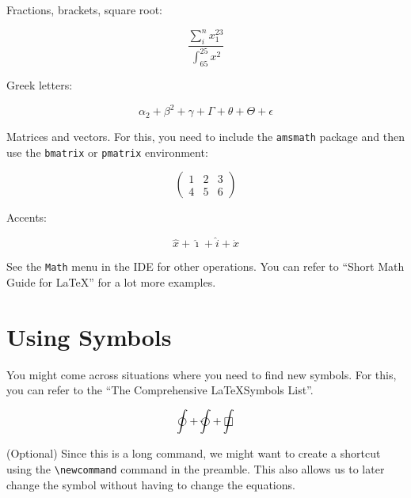 \documentclass{book}
\begin{document}
Fractions, brackets, square root: 

\begin{equation}\label{eq:nested_frac}
\frac{
	\sum_{i}^{n} x_1^{23}
}{
	\int_{65}^{25} x^{2}}
\end{equation}

Greek letters: 

\begin{equation}\label{eq:nested_frac}
\alpha_2 + \beta^2 + \gamma + \Gamma + \theta   + \Theta  + \epsilon
\end{equation}

Matrices and vectors. For this, you need to include the \texttt{amsmath} package and then use the \texttt{bmatrix} or \texttt{pmatrix} environment: 


\begin{equation}\label{eq:matrix}
	\begin{pmatrix}
    1    &    2   &   3   \\
    4   &    5   &   6
	\end{pmatrix}
\end{equation}



Accents: 

\begin{equation}\label{eq:hat1}
\hat{x} + \hat{\imath} + \hat{i}  + \dot{x}
\end{equation}




See the \texttt{Math} menu in the IDE for other operations. You can refer to ``Short Math Guide for \LaTeX'' for a lot more examples. 

\section{Using Symbols}
You might come across situations where you need to find new symbols. For this, you can refer to the ``The Comprehensive \LaTeX Symbols List''.  

\begin{equation}\label{eq:hat1}
\oint  +   \varointctrclockwise + \sqint
\end{equation}


(Optional) Since this is a long command, we might want to create a shortcut using the \verb|\newcommand| command in the preamble. This also allows us to later change the symbol without having to change the equations. 
\end{document}
